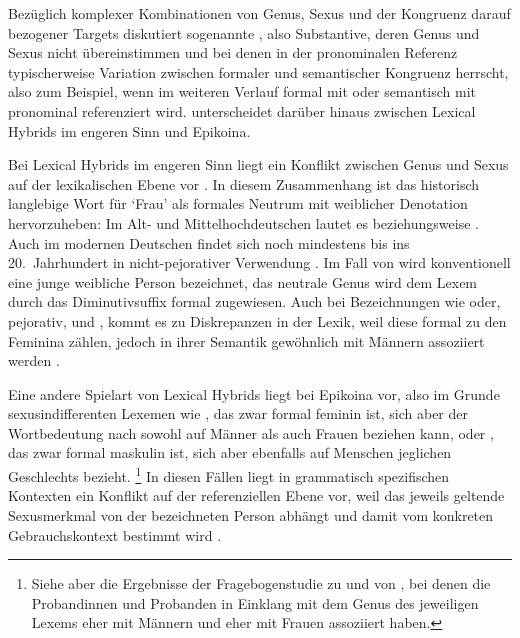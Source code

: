 Bezüglich komplexer Kombinationen von Genus, Sexus und der Kongruenz darauf
bezogener Targets diskutiert \textcite[183--184]{corbett1991} sogenannte
, also Substantive, deren Genus und Sexus nicht
übereinstimmen und bei denen in der pronominalen Referenz typischerweise
Variation zwischen formaler und semantischer Kongruenz herrscht, also zum
Beispiel, wenn  im weiteren Verlauf formal mit  oder
semantisch mit  pronominal referenziert wird. \citet{klein2022}
unterscheidet darüber hinaus zwischen Lexical Hybrids im engeren Sinn und
Epikoina.

Bei Lexical Hybrids im engeren Sinn liegt ein Konflikt zwischen Genus und Sexus
auf der lexikalischen Ebene vor \autocite[145]{klein2022}. In diesem
Zusammenhang ist das historisch langlebige Wort für `Frau' als formales Neutrum
mit weiblicher Denotation hervorzuheben: Im Alt- und
Mittelhochdeutschen lautet es  beziehungsweise
. Auch im modernen Deutschen findet sich  noch mindestens
bis ins 20.~Jahrhundert in nicht-pejorativer Verwendung
\autocite[166]{fleischer2012}. Im Fall von  wird konventionell eine
junge weibliche Person bezeichnet, das neutrale Genus wird dem Lexem durch das
Diminutivsuffix  formal zugewiesen. Auch bei Bezeichnungen wie
 oder, pejorativ,  und , kommt es zu
Diskrepanzen in der Lexik, weil diese formal zu den Feminina zählen, jedoch in
ihrer Semantik gewöhnlich mit Männern assoziiert werden
\autocite[vgl.~auch][67--68]{panther2009}.

Eine andere Spielart von Lexical Hybrids liegt bei Epikoina vor, also im Grunde
sexus\-indifferenten Lexemen wie , das zwar formal feminin ist, sich
aber der Wortbedeutung nach sowohl auf Männer als auch Frauen beziehen kann,
oder , das zwar formal maskulin ist, sich aber ebenfalls auf
Menschen jeglichen Geschlechts bezieht.%
%
	\footnote{Siehe aber die Ergebnisse der Fragebogenstudie zu
		 und  von \citet[174--183]{klein2022}, bei denen
		die Probandinnen und Probanden in Einklang mit dem Genus des jeweiligen
		Lexems  eher mit Männern und  eher mit Frauen
		assoziiert haben.}
%
In diesen Fällen liegt in grammatisch spezifischen Kontexten ein Konflikt auf
der referenziellen Ebene vor, weil das jeweils geltende Sexusmerkmal von der
bezeichneten Person abhängt und damit vom konkreten Gebrauchskontext bestimmt
wird \autocite[142--144]{klein2022}.

